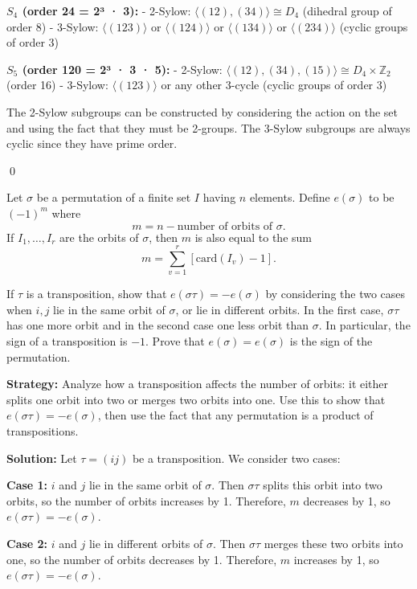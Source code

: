 \textbf{$S_4$ (order 24 = 2³ · 3):}
- 2-Sylow: $\langle (12), (34) \rangle \cong D_4$ (dihedral group of order 8)
- 3-Sylow: $\langle (123) \rangle$ or $\langle (124) \rangle$ or $\langle (134) \rangle$ or $\langle (234) \rangle$ (cyclic groups of order 3)

\textbf{$S_5$ (order 120 = 2³ · 3 · 5):}
- 2-Sylow: $\langle (12), (34), (15) \rangle \cong D_4 \times \mathbb{Z}_2$ (order 16)
- 3-Sylow: $\langle (123) \rangle$ or any other 3-cycle (cyclic groups of order 3)

The 2-Sylow subgroups can be constructed by considering the action on the set and using the fact that they must be 2-groups. The 3-Sylow subgroups are always cyclic since they have prime order.


\qed
\begin{problembox}
Let $\sigma$ be a permutation of a finite set $I$ having $n$ elements. Define $e(\sigma)$ to be $(-1)^m$ where
\[m = n - \text{number of orbits of } \sigma.\]
If $I_1, \ldots, I_r$ are the orbits of $\sigma$, then $m$ is also equal to the sum
\[m = \sum_{v=1}^r [\text{card}(I_v) - 1].\]

If $\tau$ is a transposition, show that $e(\sigma\tau) = -e(\sigma)$ by considering the two cases when $i, j$ lie in the same orbit of $\sigma$, or lie in different orbits. In the first case, $\sigma\tau$ has one more orbit and in the second case one less orbit than $\sigma$. In particular, the sign of a transposition is $-1$. Prove that $e(\sigma) = e(\sigma)$ is the sign of the permutation.
\end{problembox}

\noindent\textbf{Strategy:} Analyze how a transposition affects the number of orbits: it either splits one orbit into two or merges two orbits into one. Use this to show that $e(\sigma\tau) = -e(\sigma)$, then use the fact that any permutation is a product of transpositions.

\noindent\textbf{Solution:} Let $\tau = (ij)$ be a transposition. We consider two cases:

\textbf{Case 1:} $i$ and $j$ lie in the same orbit of $\sigma$. Then $\sigma\tau$ splits this orbit into two orbits, so the number of orbits increases by 1. Therefore, $m$ decreases by 1, so $e(\sigma\tau) = -e(\sigma)$.

\textbf{Case 2:} $i$ and $j$ lie in different orbits of $\sigma$. Then $\sigma\tau$ merges these two orbits into one, so the number of orbits decreases by 1. Therefore, $m$ increases by 1, so $e(\sigma\tau) = -e(\sigma)$.

